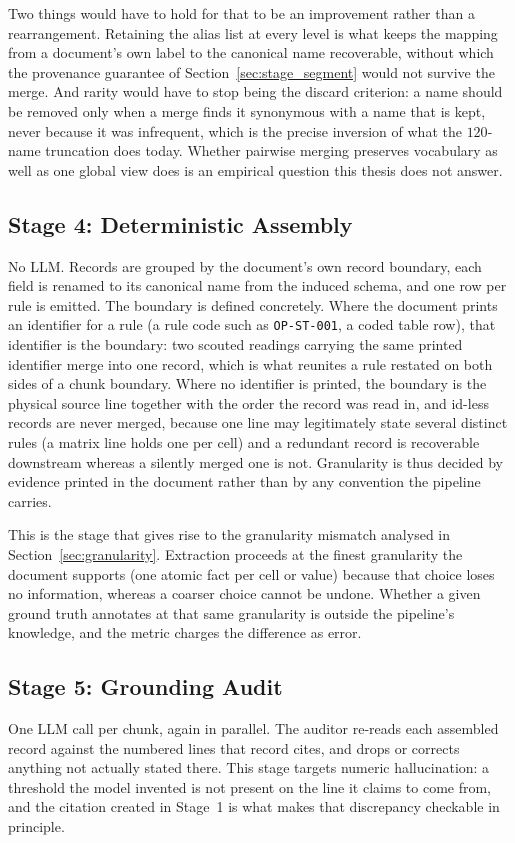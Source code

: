 \documentclass[11pt]{article}
\begin{document}
Two things would have to hold for that to be an improvement rather than a
rearrangement. Retaining the alias list at every level is what keeps the mapping
from a document's own label to the canonical name recoverable, without which the
provenance guarantee of Section~\ref{sec:stage_segment} would not survive the
merge. And rarity would have to stop being the discard criterion: a name should
be removed only when a merge finds it synonymous with a name that is kept, never
because it was infrequent, which is the precise inversion of what the $120$-name
truncation does today. Whether pairwise merging preserves vocabulary as well as
one global view does is an empirical question this thesis does not answer.

\subsection{Stage 4: Deterministic Assembly}
\label{sec:stage_assemble}
No LLM. Records are grouped by the document's own record boundary, each field is
renamed to its canonical name from the induced schema, and one row per rule is
emitted. The boundary is defined concretely. Where the document prints an
identifier for a rule (a rule code such as \texttt{OP-ST-001}, a coded table
row), that identifier is the boundary: two scouted readings carrying the same
printed identifier merge into one record, which is what reunites a rule restated
on both sides of a chunk boundary. Where no identifier is printed, the boundary
is the physical source line together with the order the record was read in, and
id-less records are never merged, because one line may legitimately state
several distinct rules (a matrix line holds one per cell) and a redundant record
is recoverable downstream whereas a silently merged one is not. Granularity is
thus decided by evidence printed in the document rather than by any convention
the pipeline carries.

This is the stage that gives rise to the granularity mismatch analysed in
Section~\ref{sec:granularity}. Extraction proceeds at the finest granularity the
document supports (one atomic fact per cell or value) because that choice
loses no information, whereas a coarser choice cannot be undone. Whether a given
ground truth annotates at that same granularity is outside the pipeline's
knowledge, and the metric charges the difference as error.

\subsection{Stage 5: Grounding Audit}
\label{sec:stage_audit}
One LLM call per chunk, again in parallel. The auditor re-reads each assembled
record against the numbered lines that record cites, and drops or corrects
anything not actually stated there. This stage targets numeric
hallucination: a threshold the model invented is not present on the line it
claims to come from, and the citation created in Stage~1 is what makes that
discrepancy checkable in principle.
\end{document}
